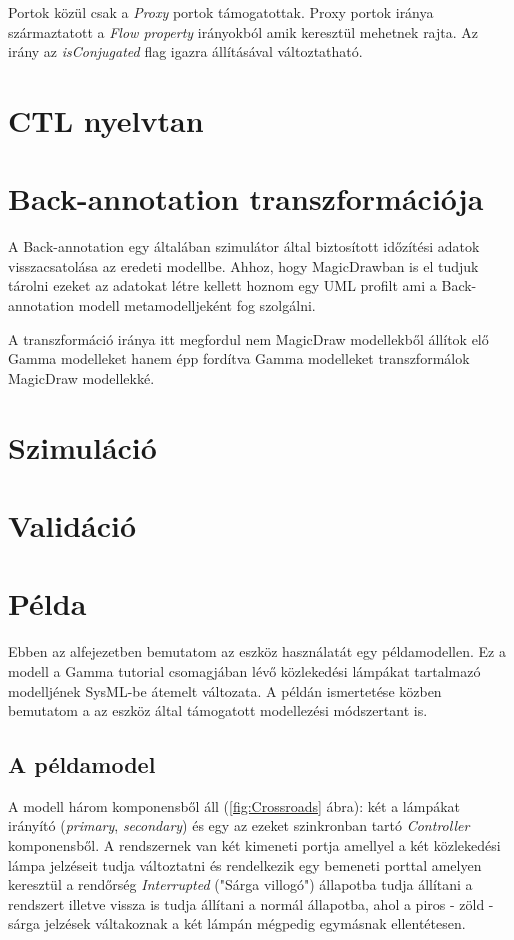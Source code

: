 Portok közül csak a \emph{Proxy} portok támogatottak. Proxy portok iránya származtatott a \emph{Flow property} irányokból amik keresztül mehetnek rajta. Az irány az \emph{isConjugated} flag igazra állításával változtatható.

\section{CTL nyelvtan}

\section{Back-annotation transzformációja}

A Back-annotation egy általában szimulátor által biztosított időzítési adatok visszacsatolása az eredeti modellbe. Ahhoz, hogy MagicDrawban is el tudjuk tárolni ezeket az adatokat létre kellett hoznom egy UML profilt ami a Back-annotation modell metamodelljeként fog szolgálni.

A transzformáció iránya itt megfordul nem MagicDraw modellekből állítok elő Gamma modelleket hanem épp fordítva Gamma modelleket transzformálok MagicDraw modellekké.



\section{Szimuláció}

\section{Validáció}

\section{Példa} %

Ebben az alfejezetben bemutatom az eszköz használatát egy példamodellen. Ez a modell a Gamma tutorial csomagjában lévő közlekedési lámpákat tartalmazó modelljének SysML-be átemelt változata. A példán ismertetése közben bemutatom a az eszköz által támogatott modellezési módszertant is.

\subsection{A példamodel}

A modell három komponensből áll (\ref{fig:Crossroads} ábra): két a lámpákat irányító (\emph{primary}, \emph{secondary}) és egy az ezeket szinkronban tartó \emph{Controller} komponensből. A rendszernek van két kimeneti portja amellyel a két közlekedési lámpa jelzéseit tudja változtatni és rendelkezik egy bemeneti porttal amelyen keresztül a rendőrség \emph{Interrupted} ("Sárga villogó") állapotba tudja állítani a rendszert illetve vissza is tudja állítani a normál állapotba, ahol a piros - zöld - sárga jelzések váltakoznak a két lámpán mégpedig egymásnak ellentétesen.

